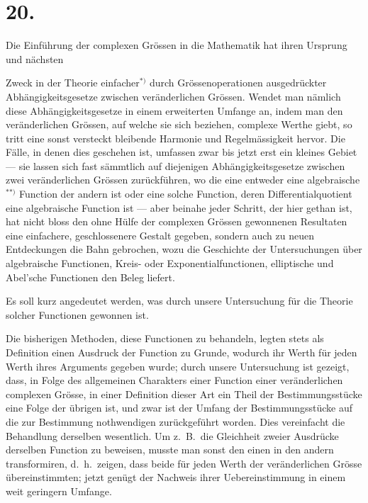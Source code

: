 \documentclass{article}
\begin{document}
\section*{20.}

Die Einführung der complexen Grössen in die Mathematik hat ihren Ursprung und nächsten

Zweck in der Theorie einfacher${}^{*)}$ durch Grössenoperationen ausgedrückter Abhängigkeitsgesetze zwischen veränderlichen Grössen. Wendet man nämlich diese Abhängigkeitsgesetze in einem erweiterten Umfange an, indem man den veränderlichen Grössen, auf welche sie sich beziehen, complexe Werthe giebt, so tritt eine sonst versteckt bleibende Harmonie und Regelmässigkeit hervor. Die Fälle, in denen dies geschehen ist, umfassen zwar bis jetzt erst ein kleines Gebiet --- sie lassen sich fast sämmtlich auf diejenigen Abhängigkeitsgesetze zwischen zwei veränderlichen Grössen zurückführen, wo die eine entweder eine algebraische${}^{**)}$ Function der andern ist oder eine solche Function, deren Differentialquotient eine algebraische Function ist --- aber beinahe jeder Schritt, der hier gethan ist, hat nicht bloss den ohne Hülfe der complexen Grössen gewonnenen Resultaten eine einfachere, geschlossenere Gestalt gegeben, sondern auch zu neuen Entdeckungen die Bahn gebrochen, wozu die Geschichte der Untersuchungen über algebraische Functionen, Kreis- oder Exponentialfunctionen, elliptische und Abel'sche Functionen den Beleg liefert.

Es soll kurz angedeutet werden, was durch unsere Untersuchung für die Theorie solcher Functionen gewonnen ist.

Die bisherigen Methoden, diese Functionen zu behandeln, legten stets als Definition einen Ausdruck der Function zu Grunde, wodurch ihr Werth für jeden Werth ihres Arguments gegeben wurde; durch unsere Untersuchung ist gezeigt, dass, in Folge des allgemeinen Charakters einer Function einer veränderlichen complexen Grösse, in einer Definition dieser Art ein Theil der Bestimmungsstücke eine Folge der übrigen ist, und zwar ist der Umfang der Bestimmungsstücke auf die zur Bestimmung nothwendigen zurückgeführt worden. Dies vereinfacht die Behandlung derselben wesentlich. Um z.\ B.\ die Gleichheit zweier Ausdrücke derselben Function zu beweisen, musste man sonst den einen in den andern transformiren, d.\ h.\ zeigen, dass beide für jeden Werth der veränderlichen Grösse übereinstimmten; jetzt genügt der Nachweis ihrer Uebereinstimmung in einem weit geringern Umfange.
\end{document}

